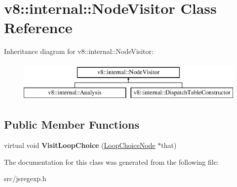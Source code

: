 \hypertarget{classv8_1_1internal_1_1_node_visitor}{}\section{v8\+:\+:internal\+:\+:Node\+Visitor Class Reference}
\label{classv8_1_1internal_1_1_node_visitor}
Inheritance diagram for v8\+:\+:internal\+:\+:Node\+Visitor\+:\begin{figure}[H]
\begin{center}
\leavevmode
\includegraphics[height=2.000000cm]{classv8_1_1internal_1_1_node_visitor}
\end{center}
\end{figure}
\subsection*{Public Member Functions}
\begin{DoxyCompactItemize}
\item 
\hypertarget{classv8_1_1internal_1_1_node_visitor_a0181d645b844eb3fdbfe3defa7277aed}{}virtual void {\bfseries Visit\+Loop\+Choice} (\hyperlink{classv8_1_1internal_1_1_loop_choice_node}{Loop\+Choice\+Node} $\ast$that)\label{classv8_1_1internal_1_1_node_visitor_a0181d645b844eb3fdbfe3defa7277aed}

\end{DoxyCompactItemize}


The documentation for this class was generated from the following file\+:\begin{DoxyCompactItemize}
\item 
src/jsregexp.\+h\end{DoxyCompactItemize}

